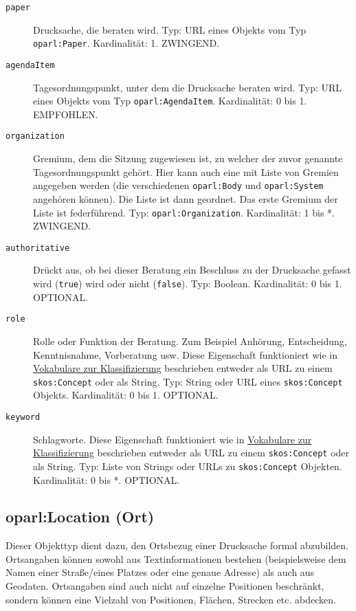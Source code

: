 \documentclass[,a4paper]{article}
\begin{document}
\begin{description}
\item[\texttt{paper}]
Drucksache, die beraten wird. Typ: URL eines Objekts vom Typ
\texttt{oparl:Paper}. Kardinalität: 1. ZWINGEND.
\item[\texttt{agendaItem}]
Tagesordnungspunkt, unter dem die Drucksache beraten wird. Typ: URL
eines Objekts vom Typ \texttt{oparl:AgendaItem}. Kardinalität: 0 bis 1.
EMPFOHLEN.
\item[\texttt{organization}]
Gremium, dem die Sitzung zugewiesen ist, zu welcher der zuvor genannte
Tagesordnungspunkt gehört. Hier kann auch eine mit Liste von Gremien
angegeben werden (die verschiedenen \texttt{oparl:Body} und
\texttt{oparl:System} angehören können). Die Liste ist dann geordnet.
Das erste Gremium der Liste ist federführend. Typ:
\texttt{oparl:Organization}. Kardinalität: 1 bis *. ZWINGEND.
\item[\texttt{authoritative}]
Drückt aus, ob bei dieser Beratung ein Beschluss zu der Drucksache
gefasst wird (\texttt{true}) wird oder nicht (\texttt{false}). Typ:
Boolean. Kardinalität: 0 bis 1. OPTIONAL.
\item[\texttt{role}]
Rolle oder Funktion der Beratung. Zum Beispiel Anhörung, Entscheidung,
Kenntnisnahme, Vorberatung usw. Diese Eigenschaft funktioniert wie in
\hyperref[vokabulareux5fklassifizierung]{Vokabulare zur Klassifizierung}
beschrieben entweder als URL zu einem \texttt{skos:Concept} oder als
String. Typ: String oder URL eines \texttt{skos:Concept} Objekts.
Kardinalität: 0 bis 1. OPTIONAL.
\item[\texttt{keyword}]
Schlagworte. Diese Eigenschaft funktioniert wie in
\hyperref[vokabulareux5fklassifizierung]{Vokabulare zur Klassifizierung}
beschrieben entweder als URL zu einem \texttt{skos:Concept} oder als
String. Typ: Liste von Strings oder URLs zu \texttt{skos:Concept}
Objekten. Kardinalität: 0 bis *. OPTIONAL.
\end{description}

\subsection{oparl:Location (Ort)}\label{oparlux5flocation}

Dieser Objekttyp dient dazu, den Ortsbezug einer Drucksache formal
abzubilden. Ortsangaben können sowohl aus Textinformationen bestehen
(beispielsweise dem Namen einer Straße/eines Platzes oder eine genaue
Adresse) als auch aus Geodaten. Ortsangaben sind auch nicht auf einzelne
Positionen beschränkt, sondern können eine Vielzahl von Positionen,
Flächen, Strecken etc. abdecken.
\end{document}
